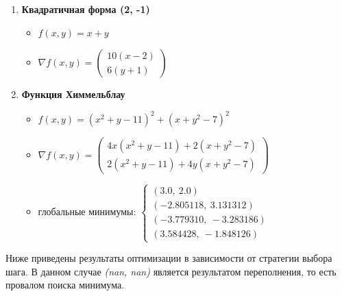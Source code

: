 \documentclass{article}
\begin{document}
\begin{enumerate}
  \item \textbf{Квадратичная форма (2, -1)}
  \begin{itemize}
    \item \( f(x, y) = x + y \)
    \item \( \nabla f(x, y) = \begin{pmatrix}
      10(x - 2) \\
      6(y + 1)
    \end{pmatrix} \)
  \end{itemize}


\item \textbf{Функция Химмельблау}
\begin{itemize}
  \item \( f(x, y) = (x^2 + y - 11)^2 + (x + y^2 - 7)^2 \)
  \item \( \nabla f(x, y) = \begin{pmatrix}
    4x(x^2 + y - 11) + 2(x + y^2 - 7) \\
    2(x^2 + y - 11) + 4y(x + y^2 - 7)
  \end{pmatrix} \)
  \item глобальные минимумы: 
  \(
    \begin{cases}
      (3.0,\ 2.0) \\
      (-2.805118,\ 3.131312) \\
      (-3.779310,\ -3.283186) \\
      (3.584428,\ -1.848126)
    \end{cases}
  \)
\end{itemize}
\end{enumerate}

Ниже приведены результаты оптимизации в зависимости от стратегии выбора шага. В данном случае \textit{(nan, nan)} является результатом переполнения, то есть провалом поиска минимума.
\end{document}
